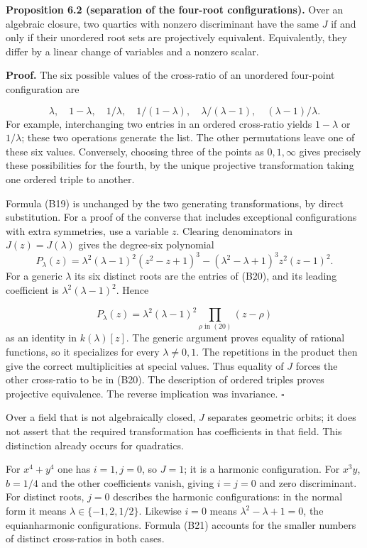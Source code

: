 \documentclass[
]{article}
\begin{document}
\protect{}\label{proposition-6-2}{}

\textbf{Proposition 6.2 (separation of the four-root configurations).}
Over an algebraic closure, two quartics with nonzero discriminant have
the same \(J\) if and only if their unordered root sets are projectively
equivalent. Equivalently, they differ by a linear change of variables
and a nonzero scalar.

\textbf{Proof.} The six possible values of the cross-ratio of an
unordered four-point configuration are
\protect{}\label{equation-B20}{}

\[
\lambda,\quad1-\lambda,\quad1/\lambda,\quad
1/(1-\lambda),\quad\lambda/(\lambda-1),\quad(\lambda-1)/\lambda.
\tag{B20}
\] For example, interchanging two entries in an ordered cross-ratio
yields \(1-\lambda\) or \(1/\lambda\); these two operations generate the
list. The other permutations leave one of these six values. Conversely,
choosing three of the points as \(0,1,\infty\) gives precisely these
possibilities for the fourth, by the unique projective transformation
taking one ordered triple to another.

Formula (B19) is unchanged by the two generating transformations, by
direct substitution. For a proof of the converse that includes
exceptional configurations with extra symmetries, use a variable \(z\).
Clearing denominators in \(J(z)=J(\lambda)\) gives the degree-six
polynomial \[
P_\lambda(z)=
\lambda^2(\lambda-1)^2(z^2-z+1)^3
-(\lambda^2-\lambda+1)^3z^2(z-1)^2.
\] For a generic \(\lambda\) its six distinct roots are the entries of
(B20), and its leading coefficient is \(\lambda^2(\lambda-1)^2\). Hence
\protect{}\label{equation-B21}{}

\[
P_\lambda(z)=\lambda^2(\lambda-1)^2
\prod_{\rho\text{ in }(20)}(z-\rho)
\tag{B21}
\] as an identity in \(k(\lambda)[z]\). The generic argument proves
equality of rational functions, so it specializes for every
\(\lambda\ne0,1\). The repetitions in the product then give the correct
multiplicities at special values. Thus equality of \(J\) forces the
other cross-ratio to be in (B20). The description of ordered triples
proves projective equivalence. The reverse implication was invariance.
\(\square\)

Over a field that is not algebraically closed, \(J\) separates geometric
orbits; it does not assert that the required transformation has
coefficients in that field. This distinction already occurs for
quadratics.

For \(x^4+y^4\) one has \(i=1,j=0\), so \(J=1\); it is a harmonic
configuration. For \(x^3y\), \(b=1/4\) and the other coefficients
vanish, giving \(i=j=0\) and zero discriminant. For distinct roots,
\(j=0\) describes the harmonic configurations: in the normal form it
means \(\lambda\in\{-1,2,1/2\}\). Likewise \(i=0\) means
\(\lambda^2-\lambda+1=0\), the equianharmonic configurations. Formula
(B21) accounts for the smaller numbers of distinct cross-ratios in both
cases.
\end{document}
